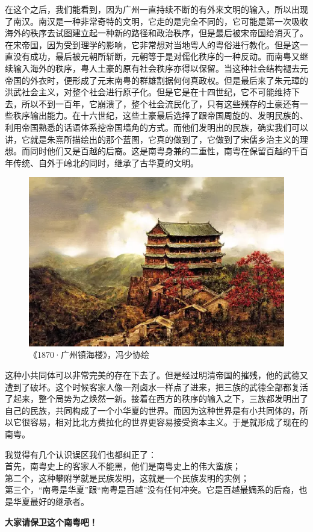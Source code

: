在这个之后，我们能看到，因为广州一直持续不断的有外来文明的输入，所以出现了南汉。南汉是一种非常奇特的文明，它走的是完全不同的，它可能是第一次吸收海外的秩序去试图建立起一种新的路径和政治秩序，但是最后被宋帝国给消灭了。在宋帝国，因为受到理学的影响，它非常想对当地粤人的粤俗进行教化。但是这一直没有成功，最后被元朝所斩断，元朝等于是对儒化秩序的一种反动。而南粤又继续输入海外的秩序，粤人土豪的原有社会秩序亦得以保留。当这种社会结构褪去元帝国的外衣时，便形成了元末南粤的群雄割据何何真政权。但是最后来了朱元璋的洪武社会主义，对整个社会进行原子化。但是它是在十四世纪，它不可能维持下去，所以不到一百年，它崩溃了，整个社会流民化了，只有这些残存的土豪还有一些秩序输出能力。在十六世纪，这些土豪最后选择了跟帝国周旋的、发明民族的、利用帝国熟悉的话语体系挖帝国墙角的方式。而他们发明出的民族，确实我们可以讲，它就是朱熹所描绘出的那个蓝图，它真的做到了，它做到了宋儒乡治主义的理想。而同时他们又是百越的后裔。这是南粤身兼的二重性，南粤在保留百越的千百年传统、自外于岭北的同时，继承了古华夏的文明。

\begin{figure}
	\centering
	\includegraphics[width=\textwidth]{images/image-83}
	\caption{《1870·广州镇海楼》，冯少协绘}
\end{figure}

这种小共同体可以非常完美的存在下去了。但是经过明清帝国的摧残，他的武德又遭到了破坏。这个时候客家人像一剂卤水一样点了进来，把三族的武德全部都复活了起来，整个局势为之焕然一新。接着在西方的秩序的输入之下，三族都发明出了自己的民族，共同构成了一个小华夏的世界。而因为这种世界是有小共同体的，所以它很容易，相对比北方费拉化的世界更容易接受资本主义。于是就形成了现在的南粤。

我觉得有几个认识误区我们也都纠正了：\\
首先，南粤史上的客家人不能黑，他们是南粤史上的伟大蛮族；\\
第二个，这种攀附学就是民族发明，这就是一个民族发明的实例；\\
第三个，“南粤是华夏”跟“南粤是百越”没有任何冲突。它是百越最嫡系的后裔，也是华夏最好的继承者。

\textbf{大家请保卫这个南粤吧！}







